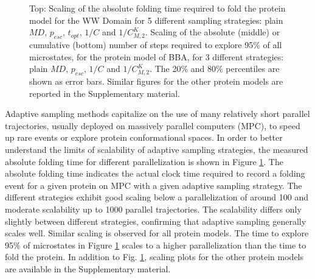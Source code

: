 \begin{figure}[H]
\begin{subfigure}[t]{0.5\textwidth}
  \end{subfigure}
  \caption{Top: Scaling of the absolute folding time required to fold the
  protein model for the WW Domain for 5 different sampling strategies: plain
  $MD$, $p_{esc}$, $t_{opt}$, $1/C$ and $1/C_{M,2}^K$. Scaling of the
  absolute (middle) or cumulative (bottom) number of steps required to explore
  95\% of all microstates, for the protein  model of BBA, for 3 different
  strategies: plain $MD$, $p_{esc}$, $1/C$ and $1/C_{M,2}^K$.  
  The 20\% and 80\% percentiles are shown as error bars. 
  Similar figures for the other
  protein models are reported in the Supplementary material.}
  \label{fig:scaling}
\end{figure}

Adaptive sampling methods capitalize on the use of many relatively short
parallel trajectories, usually deployed on massively parallel computers (MPC),
to speed up rare events or explore protein conformational spaces. In order to
better understand the limits of scalability of adaptive sampling strategies,
the measured absolute folding time for different parallelization is shown in
Figure \ref{fig:scaling}. The absolute folding time indicates the actual clock
time required to record a folding event for a given protein on MPC with a given
adaptive sampling strategy. The different strategies exhibit good scaling below
a parallelization of around 100 and moderate scalability up to 1000 parallel
trajectories. The scalability differs only slightly between different
strategies, confirming that adaptive sampling generally scales well.
Similar scaling is observed for all protein models. The time to explore 95\% of
microstates in Figure \ref{fig:scaling} scales to a higher parallelization than
the time to fold the protein. In addition to Fig.
\ref{fig:scaling}, scaling plots for the other protein models are
available in the Supplementary material. 

